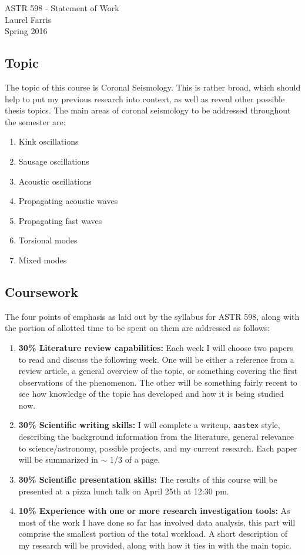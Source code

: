 \documentclass[12pt]{article}
\begin{document}
\begin{center}\Large
    \Large ASTR 598 - Statement of Work\\
    \large Laurel Farris\\
    \normalsize Spring 2016
\end{center}

\subsection*{Topic}
The topic of this course is Coronal Seismology. This is rather
broad, which should help
to put my previous research into context, as well as reveal other
possible thesis topics. The
main areas of coronal seismology to be addressed throughout the
semester are:
\begin{enumerate}
    \item Kink oscillations
    \item Sausage oscillations
    \item Acoustic oscillations
    \item Propagating acoustic waves
    \item Propagating fast waves
    \item Torsional modes
    \item Mixed modes
\end{enumerate}

\subsection*{Coursework}
The four points of emphasis as laid out by the syllabus for ASTR 598,
along with the portion
of allotted time to be spent on them are addressed as follows:
\begin{enumerate}
    \item \textbf{30\% Literature review capabilities:}
        Each week I will choose two papers to read and discuss the following
        week. One will be either a reference from a review article,
        a general overview of the topic, or something covering the first
        observations of the phenomenon. The other will be something fairly
        recent to see how knowledge of the topic has developed and how it is
        being studied now.
    \item \textbf{30\% Scientific writing skills:}
        I will complete a writeup, \texttt{aastex} style,
        describing the background
        information from the literature, general relevance to
        science/astronomy, possible projects,
        and my current research. Each paper will be summarized in
        $\sim$ 1/3 of a page.
    \item \textbf{30\% Scientific presentation skills:}
        The results of this course will be presented at a pizza lunch
        talk on April 25th at 12:30 pm.
    \item \textbf{10\% Experience with one or more research
        investigation tools:}
        As most of the work I have done so far has involved data
        analysis, this part will comprise the smallest portion of the
        total workload. A short description of my research will be provided,
        along with how it ties in with the main topic.
\end{enumerate}
\end{document}
